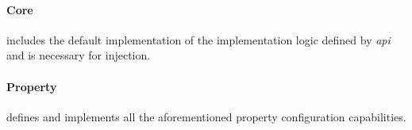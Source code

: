 	\paragraph{Core} includes the default implementation of the implementation logic defined by \emph{api} and is necessary for injection.
	
	\paragraph{Property} defines and implements all the aforementioned property configuration capabilities.
	
%













